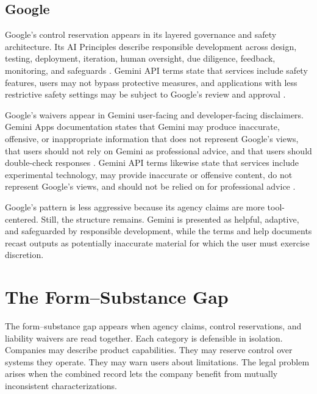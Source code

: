 \documentclass[11pt,a4paper]{article}
\begin{document}
\subsection{Google}

Google's control reservation appears in its layered governance and safety architecture. Its AI Principles describe responsible development across design, testing, deployment, iteration, human oversight, due diligence, feedback, monitoring, and safeguards \citep{google2026aiprinciples}. Gemini API terms state that services include safety features, users may not bypass protective measures, and applications with less restrictive safety settings may be subject to Google's review and approval \citep{google2024geminiapiterms}.

Google's waivers appear in Gemini user-facing and developer-facing disclaimers. Gemini Apps documentation states that Gemini may produce inaccurate, offensive, or inappropriate information that does not represent Google's views, that users should not rely on Gemini as professional advice, and that users should double-check responses \citep{google2026geminiresponses}. Gemini API terms likewise state that services include experimental technology, may provide inaccurate or offensive content, do not represent Google's views, and should not be relied on for professional advice \citep{google2024geminiapiterms}.

Google's pattern is less aggressive because its agency claims are more tool-centered. Still, the structure remains. Gemini is presented as helpful, adaptive, and safeguarded by responsible development, while the terms and help documents recast outputs as potentially inaccurate material for which the user must exercise discretion.

\section{The Form--Substance Gap}

The form--substance gap appears when agency claims, control reservations, and liability waivers are read together. Each category is defensible in isolation. Companies may describe product capabilities. They may reserve control over systems they operate. They may warn users about limitations. The legal problem arises when the combined record lets the company benefit from mutually inconsistent characterizations.
\end{document}
